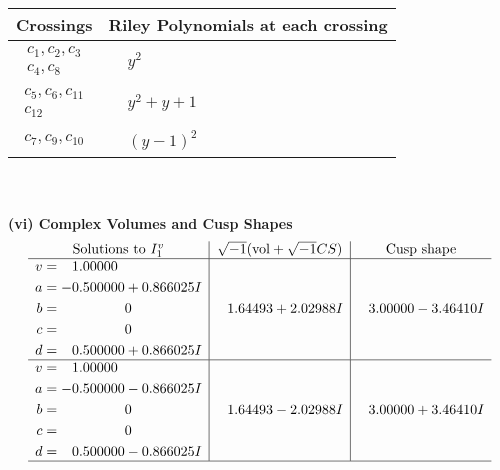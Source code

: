 \documentclass[1p]{elsarticle_modified}
\theoremstyle{definition}
\newcommand{\I}{\sqrt{-1}}
\begin{document}
\begin{tabular}{m{50pt}|m{274pt}}
Crossings & \hspace{64pt}Riley Polynomials at each crossing \\
\hline $$\begin{aligned}c_{1},c_{2},c_{3}\\c_{4},c_{8}\end{aligned}$$&$\begin{aligned}
&y^2
\end{aligned}$\\
\hline $$\begin{aligned}c_{5},c_{6},c_{11}\\c_{12}\end{aligned}$$&$\begin{aligned}
&y^2+y+1
\end{aligned}$\\
\hline $$\begin{aligned}c_{7},c_{9},c_{10}\end{aligned}$$&$\begin{aligned}
&(y-1)^2
\end{aligned}$\\
\hline
\end{tabular}\\~\\
\newpage\flushleft \textbf{(vi) Complex Volumes and Cusp Shapes}
$$\begin{array}{c|c|c}  
\text{Solutions to }I^v_{1}& \I (\text{vol} + \sqrt{-1}CS) & \text{Cusp shape}\\
 \hline 
\begin{aligned}
v &= \phantom{-}1.00000\phantom{ +0.000000I} \\
a &= -0.500000 + 0.866025 I \\
b &= \phantom{-0.000000 } 0 \\
c &= \phantom{-0.000000 } 0 \\
d &= \phantom{-}0.500000 + 0.866025 I\end{aligned}
 & \phantom{-}1.64493 + 2.02988 I & \phantom{-}3.00000 - 3.46410 I \\ \hline\begin{aligned}
v &= \phantom{-}1.00000\phantom{ +0.000000I} \\
a &= -0.500000 - 0.866025 I \\
b &= \phantom{-0.000000 } 0 \\
c &= \phantom{-0.000000 } 0 \\
d &= \phantom{-}0.500000 - 0.866025 I\end{aligned}
 & \phantom{-}1.64493 - 2.02988 I & \phantom{-}3.00000 + 3.46410 I\\
 \hline 
 \end{array}$$\newpage
\end{document}
